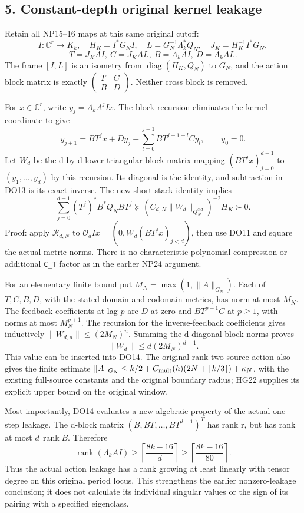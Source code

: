 \subsection{5. Constant-depth original kernel leakage}\label{pdepth:constant-depth-original-kernel-leakage}

Retain all NP15--16 maps at this same original cutoff: \[
I:\mathbb C^r\to K_k,\quad H_K=I^*G_NI,\quad
L=G_N^{-1}\Lambda_k^*Q_N,\quad J_K=H_K^{-1}I^*G_N,
\] \[
T=J_KAI,\ C=J_KAL,\ B=\Lambda_k AI,\ D=\Lambda_k AL.
\tag{DO12}
\] The frame \([I,L]\) is an isometry from \(\operatorname{diag}(H_K,Q_N)\) to \(G_N\), and the action block matrix is exactly \(\left(\begin{smallmatrix}T&C\\B&D\end{smallmatrix}\right)\). Neither cross block is removed.

For \(x\in\mathbb C^r\), write \(y_j=\Lambda_k A^jIx\). The block recursion eliminates the kernel coordinate to give \[
y_{j+1}=BT^jx+Dy_j+
\sum_{l=0}^{j-1}BT^{j-1-l}Cy_l,\qquad y_0=0.
\tag{DO13}
\] Let \(W_d\) be the d by d lower triangular block matrix mapping \((BT^jx)_{j=0}^{d-1}\) to \((y_1,\ldots,y_d)\) by this recursion. Its diagonal is the identity, and subtraction in DO13 is its exact inverse. The new short-stack identity implies \[
\boxed{\displaystyle
\sum_{j=0}^{d-1}(T^j)^*B^*Q_NBT^j
\succeq (C_{d,N}\|W_d\|_{Q_N^{\oplus d}})^{-2}H_K\succ0.}
\tag{DO14}
\] Proof: apply \(\mathcal R_{d,N}\) to \(\mathcal O_dIx=(0,W_d(BT^jx)_{j<d})\), then use DO11 and square the actual metric norms. There is no characteristic-polynomial compression or additional \texttt{C\_T} factor as in the earlier NP24 argument.

For an elementary finite bound put \(M_N=\max(1,\|A\|_{G_N})\). Each of \(T,C,B,D\), with the stated domain and codomain metrics, has norm at most \(M_N\). The feedback coefficients at lag \(p\) are \(D\) at zero and \(BT^{p-1}C\) at \(p\ge1\), with norms at most \(M_N^{p+1}\). The recursion for the inverse-feedback coefficients gives inductively \(\|W_{d,n}\|\le(2M_N)^n\). Summing the d diagonal-block norms proves \[
\|W_d\|\le d(2M_N)^{d-1}.
\tag{DO15}
\] This value can be inserted into DO14. The original rank-two source action also gives the finite estimate \(\|A\|_{G_N}\le k/2+C_{\rm mult}(h)(2N+\lfloor k/3\rfloor)+\kappa_N\), with the existing full-source constants and the original boundary radius; HG22 supplies its explicit upper bound on the original window.

Most importantly, DO14 evaluates a new algebraic property of the actual one-step leakage. The d-block matrix \((B,BT,\ldots,BT^{d-1})^T\) has rank r, but has rank at most \(d\,\operatorname{rank}B\). Therefore \[
\boxed{\displaystyle
\operatorname{rank}(\Lambda_k AI)
\ge\left\lceil\frac{8k-16}{d}\right\rceil
\ge\left\lceil\frac{8k-16}{80}\right\rceil.}
\tag{DO16}
\] Thus the actual action leakage has a rank growing at least linearly with tensor degree on this original period locus. This strengthens the earlier nonzero-leakage conclusion; it does not calculate its individual singular values or the sign of its pairing with a specified eigenclass.

